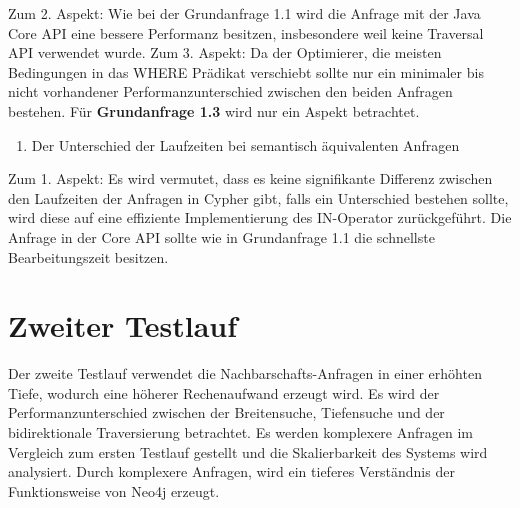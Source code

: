 Zum 2. Aspekt: Wie bei der Grundanfrage 1.1 wird   die Anfrage mit der Java Core API eine bessere Performanz besitzen, insbesondere weil keine Traversal API verwendet wurde. \newline
Zum 3. Aspekt: Da der Optimierer, die meisten Bedingungen in das WHERE Prädikat verschiebt sollte nur ein minimaler bis nicht vorhandener Performanzunterschied zwischen den beiden Anfragen bestehen. \newline \newline
Für \textbf{Grundanfrage 1.3} wird nur ein Aspekt betrachtet.
\begin{enumerate}
	\item Der Unterschied der Laufzeiten bei semantisch äquivalenten Anfragen 
\end{enumerate}
Zum 1. Aspekt: Es wird vermutet, dass es keine signifikante Differenz zwischen den Laufzeiten der Anfragen in Cypher gibt, falls ein Unterschied bestehen sollte, wird diese auf eine effiziente Implementierung des IN-Operator zurückgeführt. Die Anfrage in der Core API sollte wie in Grundanfrage 1.1 die schnellste Bearbeitungszeit besitzen.

\section{Zweiter Testlauf}
Der zweite Testlauf verwendet die Nachbarschafts-Anfragen in einer erhöhten Tiefe, wodurch eine höherer Rechenaufwand erzeugt wird. Es wird der Performanzunterschied zwischen der Breitensuche, Tiefensuche und der bidirektionale Traversierung betrachtet. Es werden komplexere Anfragen im Vergleich zum ersten Testlauf gestellt und die Skalierbarkeit des Systems wird analysiert. Durch komplexere Anfragen, wird ein tieferes Verständnis der Funktionsweise von Neo4j erzeugt. 
